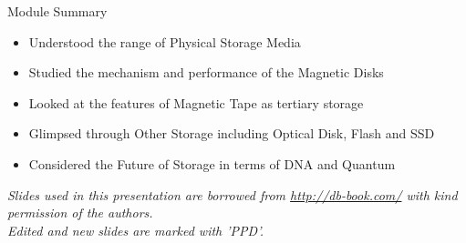 \documentclass[aspectratio=169, xcolor=dvipsnames]{beamer}
\begin{document}
\begin{frame}{Module Summary}
    \begin{block}{}
        \begin{itemize}
            \item Understood the range of Physical Storage Media
            \item Studied the mechanism and performance of the Magnetic Disks
            \item Looked at the features of Magnetic Tape as tertiary storage
            \item Glimpsed through Other Storage including Optical Disk, Flash and SSD
            \item Considered the Future of Storage in terms of DNA and Quantum
        \end{itemize}
    \end{block}
    \vspace{2em}
    \begin{center}
        \small \textit{Slides used in this presentation are borrowed from \url{http://db-book.com/} with kind permission of the authors.} \\
        \small \textit{Edited and new slides are marked with 'PPD'.}
    \end{center}
\end{frame}
\end{document}
